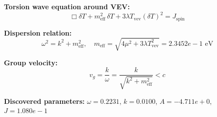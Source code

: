 
\textbf{Torsion wave equation around VEV:}
\begin{equation}
  \Box \delta T + m_{\text{eff}}^2 \, \delta T + 3\lambda T_{\text{vev}} (\delta T)^2 = J_{\text{spin}}
\end{equation}

\textbf{Dispersion relation:}
\begin{equation}
  \omega^2 = k^2 + m_{\text{eff}}^2, \quad
  m_{\text{eff}} = \sqrt{4\mu^2 + 3\lambda T_{\text{vev}}^2} = 2.3452e-1 \text{ eV}
\end{equation}

\textbf{Group velocity:}
\begin{equation}
  v_g = \frac{k}{\omega} = \frac{k}{\sqrt{k^2 + m_{\text{eff}}^2}} < c
\end{equation}

\textbf{Discovered parameters:}
$\omega = 0.2231$, \quad
$k = 0.0100$, \quad
$A = -4.711e+0$, \quad
$J = 1.080e-1$